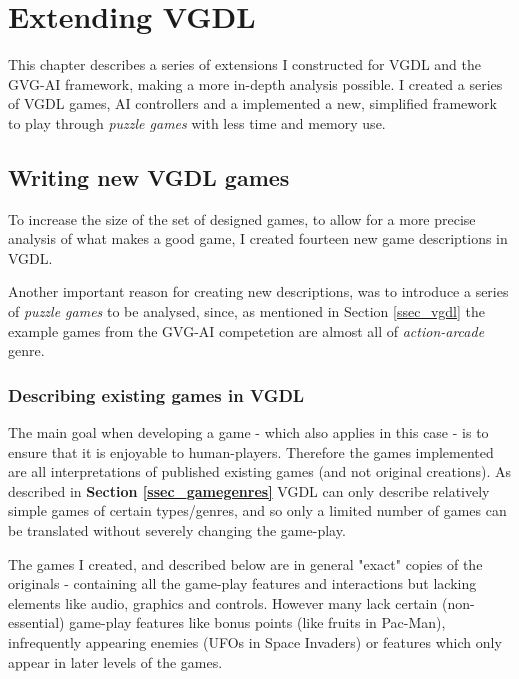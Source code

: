 \documentclass[a4paper,titlepage,final]{report}
\begin{document}
\chapter{Extending VGDL}
\label{ch_extending}
This chapter describes a series of extensions I constructed for VGDL and the GVG-AI framework, making a more in-depth analysis possible.
I created a series of VGDL games, AI controllers and a implemented a new, simplified framework to play through \textit{puzzle games} with less time and memory use.


\section{Writing new VGDL games}
\label{sec_writingnewvgdl}
To increase the size of the set of designed games, to allow for a more precise analysis of what makes a good game, I created fourteen new game descriptions in VGDL. 

Another important reason for creating new descriptions, was to introduce a series of \emph{puzzle games} to be analysed, since, as mentioned in Section \ref{ssec_vgdl} the example games from the GVG-AI competetion are almost all of \textit{action-arcade} genre.


\subsection{Describing existing games in VGDL}
The main goal when developing a game - which also applies in this case - is to ensure that it is enjoyable to human-players. 
Therefore the games implemented are all interpretations of published existing games (and not original creations).
As described in \textbf{Section \ref{ssec_gamegenres}} VGDL can only describe relatively simple games of certain types/genres, and so only a limited number of games can be translated without severely changing the game-play.

The games I created, and described below are in general "exact" copies of the originals - containing all the game-play features and interactions but lacking elements like audio, graphics and controls. 
However many lack certain (non-essential) game-play features like bonus points (like fruits in Pac-Man), infrequently appearing enemies (UFOs in Space Invaders) or features which only appear in later levels of the games.
\end{document}
